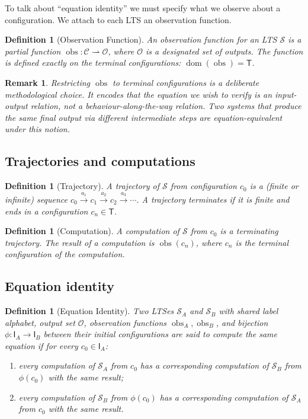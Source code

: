 \documentclass[twocolumn,11pt,a4paper]{article}
\newtheorem{definition}[theorem]{Definition}
\newtheorem{remark}[theorem]{Remark}
\DeclareMathOperator{\dom}{dom}
\DeclareMathOperator{\obs}{obs}
\newcommand{\Conf}{\mathcal{C}}
\newcommand{\Term}{\mathsf{T}}
\newcommand{\Init}{\mathsf{I}}
\newcommand{\Out}{\mathcal{O}}
\newcommand{\Sys}{\mathcal{S}}
\begin{document}
To talk about ``equation identity'' we must specify what we observe about a configuration. We attach to each LTS an observation function.

\begin{definition}[Observation Function]
\label{def:observation}
An \emph{observation function} for an LTS $\Sys$ is a partial function $\obs : \Conf \rightharpoonup \Out$, where $\Out$ is a designated set of \emph{outputs}. The function is defined exactly on the terminal configurations: $\dom(\obs) = \Term$.
\end{definition}

\begin{remark}
Restricting $\obs$ to terminal configurations is a deliberate methodological choice. It encodes that the equation we wish to verify is an input-output relation, not a behaviour-along-the-way relation. Two systems that produce the same final output via different intermediate steps are equation-equivalent under this notion.
\end{remark}

\subsection{Trajectories and computations}

\begin{definition}[Trajectory]
\label{def:trajectory}
A \emph{trajectory} of $\Sys$ from configuration $c_0$ is a (finite or infinite) sequence $c_0 \xrightarrow{a_1} c_1 \xrightarrow{a_2} c_2 \xrightarrow{a_3} \cdots$. A trajectory \emph{terminates} if it is finite and ends in a configuration $c_n \in \Term$.
\end{definition}

\begin{definition}[Computation]
\label{def:computation}
A \emph{computation} of $\Sys$ from $c_0$ is a terminating trajectory. The \emph{result} of a computation is $\obs(c_n)$, where $c_n$ is the terminal configuration of the computation.
\end{definition}

\subsection{Equation identity}

\begin{definition}[Equation Identity]
\label{def:equation-identity}
Two LTSes $\Sys_A$ and $\Sys_B$ with shared label alphabet, output set $\Out$, observation functions $\obs_A, \obs_B$, and bijection $\phi : \Init_A \to \Init_B$ between their initial configurations are said to \emph{compute the same equation} if for every $c_0 \in \Init_A$:
\begin{enumerate}[nosep,leftmargin=*]
\item every computation of $\Sys_A$ from $c_0$ has a corresponding computation of $\Sys_B$ from $\phi(c_0)$ with the same result;
\item every computation of $\Sys_B$ from $\phi(c_0)$ has a corresponding computation of $\Sys_A$ from $c_0$ with the same result.
\end{enumerate}
\end{definition}
\end{document}

